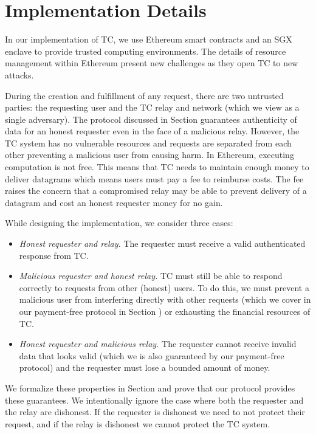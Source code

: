 
\section{\tc Implementation Details}
\label{sec:impl}

In our implementation of TC, we use Ethereum smart contracts and an SGX enclave to provide trusted computing environments.
The details of resource management within Ethereum present new challenges as they open TC to new attacks.

During the creation and fulfillment of any request, there are two untrusted parties:
the requesting user and the TC relay and network (which we view as a single adversary).
The protocol discussed in Section  guarantees authenticity of data for an honest requester even in the face of a malicious relay.
However, the TC system has no vulnerable resources and requests are separated from each other preventing a malicious user from causing harm.
In Ethereum, executing computation is not free.
This means that TC needs to maintain enough money to deliver datagrams which means users must pay a fee to reimburse costs.
The fee raises the concern that a compromised relay may be able to prevent delivery of a datagram and cost an honest requester money for no gain.

While designing the implementation, we consider three cases:
\begin{itemize}
  \item {\it Honest requester and relay.}
    The requester must receive a valid authenticated response from TC.

  \item {\it Malicious requester and honest relay.}
    TC must still be able to respond correctly to requests from other (honest) users.
    To do this, we must prevent a malicious user from interfering directly with other requests (which we cover in our payment-free protocol in Section )
    or exhausting the financial resources of TC.

  \item {\it Honest requester and malicious relay.}
    The requester cannot receive invalid data that looks valid (which we is also guaranteed by our payment-free protocol)
    and the requester must lose a bounded amount of money.
\end{itemize}
We formalize these properties in Section  and prove that our protocol provides these guarantees.
We intentionally ignore the case where both the requester and the relay are dishonest.
If the requester is dishonest we need to not protect their request, and if the relay is dishonest we cannot protect the TC system.

